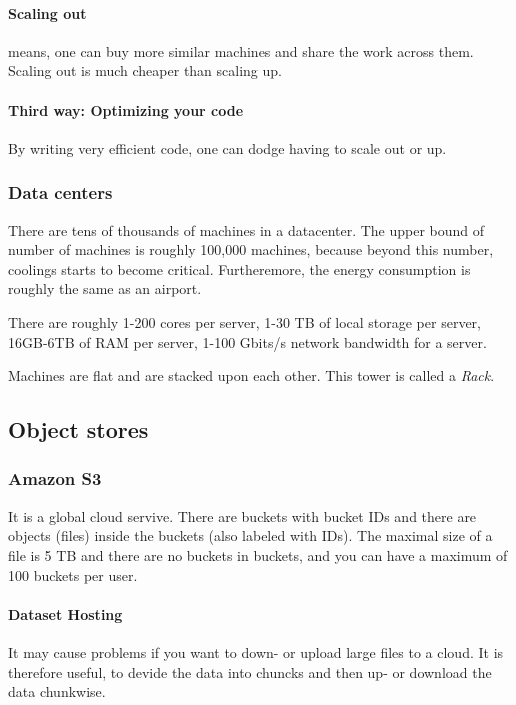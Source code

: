 \paragraph{Scaling out} means, one can buy more similar machines and share the work across them. Scaling out is much cheaper than scaling up.

\paragraph{Third way: Optimizing your code} By writing very efficient code, one can dodge having to scale out or up.

\subsubsection{Data centers}
There are tens of thousands of machines in a datacenter. The upper bound of number of machines is roughly 100,000 machines, because beyond this number, coolings starts to become critical. Furtheremore, the energy consumption is roughly the same as an airport.

There are roughly 1-200 cores per server, 1-30 TB of local storage per server, 16GB-6TB of RAM per server, 1-100 Gbits/s network bandwidth for a server.

Machines are flat and are stacked upon each other. This tower is called a \textit{Rack}.


\subsection{Object stores}

\subsubsection{Amazon S3}

It is a global cloud servive. There are buckets with bucket IDs and there are objects (files) inside the buckets (also labeled with IDs). The maximal size of a file is 5 TB and there are no buckets in buckets, and you can have a maximum of 100 buckets per user.

\paragraph{Dataset Hosting}
It may cause problems if you want to down- or upload large files to a cloud. It is therefore useful, to devide the data into chuncks and then up- or download the data chunkwise.

